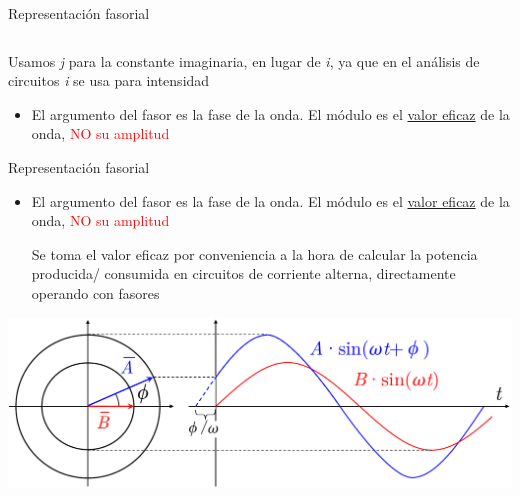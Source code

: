\documentclass[aspectratio=169, usenames,svgnames,dvipsnames]{beamer}
\begin{document}
\begin{frame}{Representación fasorial}
\begin{itemize}
\begin{columns}
\begin{column}{0.35\columnwidth}
        \end{column}        
        \end{columns}

        \vspace*{3mm}
        Usamos \alert{\textit{j} para la constante imaginaria}, en lugar de \textit{i}, ya que en el análisis de circuitos \textit{i} se usa para intensidad
    \end{itemize}    
    
    \begin{itemize}
        \item El \alert{argumento} del fasor es la \alert{fase} de la onda. El \alert{módulo} es el \alert{\underline{valor eficaz}} de la onda, \textcolor{red}{NO su amplitud} 
    \end{itemize}

\end{frame}


\begin{frame}{Representación fasorial}  

    \vspace{2mm}
    \begin{itemize}
        \item El \alert{argumento} del fasor es la \alert{fase} de la onda. El \alert{módulo} es el \alert{\underline{valor eficaz}} de la onda, \textcolor{red}{NO su amplitud} 

        \vspace*{3mm}
        Se toma el valor eficaz por \alert{conveniencia a la hora de calcular la potencia producida/ consumida} en circuitos de corriente alterna, directamente operando con fasores

        \vspace*{4mm}
    \end{itemize}
    
    \begin{center}
        \includegraphics[height=0.35\textheight]{../figs/Fasor_definicion.pdf}
    \end{center}
\end{frame}
\end{document}
